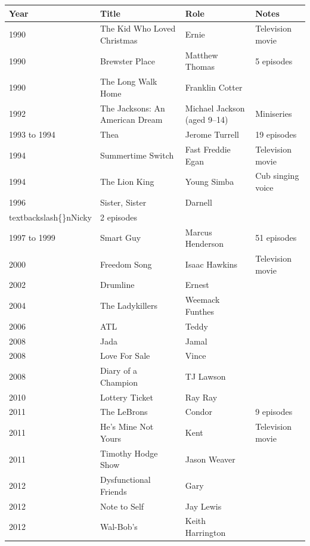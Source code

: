 \documentclass{article}
\begin{document}
\begin{tabular}{llll}
\toprule
Year & Title & Role & Notes \\
\midrule
1990 & The Kid Who Loved Christmas & Ernie & Television movie \\
1990 & Brewster Place & Matthew Thomas & 5 episodes \\
1990 & The Long Walk Home & Franklin Cotter &  \\
1992 & The Jacksons: An American Dream & Michael Jackson (aged 9–14) & Miniseries \\
1993 to 1994 & Thea & Jerome Turrell & 19 episodes \\
1994 & Summertime Switch & Fast Freddie Egan & Television movie \\
1994 & The Lion King & Young Simba & Cub singing voice \\
1996 & Sister, Sister & Darnell\\textbackslash\{\}nNicky & 2 episodes \\
1997 to 1999 & Smart Guy & Marcus Henderson & 51 episodes \\
2000 & Freedom Song & Isaac Hawkins & Television movie \\
2002 & Drumline & Ernest &  \\
2004 & The Ladykillers & Weemack Funthes &  \\
2006 & ATL & Teddy &  \\
2008 & Jada & Jamal &  \\
2008 & Love For Sale & Vince &  \\
2008 & Diary of a Champion & TJ Lawson &  \\
2010 & Lottery Ticket & Ray Ray &  \\
2011 & The LeBrons & Condor & 9 episodes \\
2011 & He's Mine Not Yours & Kent & Television movie \\
2011 & Timothy Hodge Show & Jason Weaver &  \\
2012 & Dysfunctional Friends & Gary &  \\
2012 & Note to Self & Jay Lewis &  \\
2012 & Wal-Bob's & Keith Harrington &  \\
\bottomrule
\end{tabular}
\end{document}

